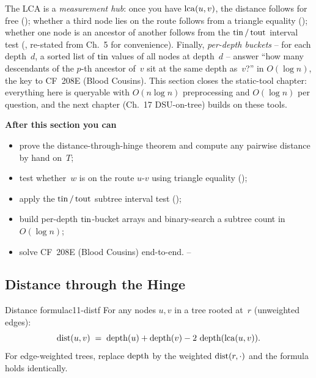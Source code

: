 \begin{topicintro}
The LCA is a \emph{measurement hub}: once you have \(\operatorname{lca}(u,v)\), the
distance follows for free (); whether a third node
lies on the route follows from a triangle equality
(); whether one node is an ancestor of another
follows from the \(\operatorname{tin}/\operatorname{tout}\) interval test (,
re-stated from Ch.~5 for convenience).  Finally, \emph{per-depth
buckets} -- for each depth~\(d\), a sorted list of \(\operatorname{tin}\) values of all
nodes at depth~\(d\) -- answer ``how many descendants of the \(p\)-th
ancestor of~\(v\) sit at the same depth as~\(v\)?'' in \(O(\log n)\),
the key to CF~208E (Blood Cousins).  This section closes the static-tool
chapter: everything here is queryable with \(O(n\log n)\) preprocessing
and \(O(\log n)\) per question, and the next chapter (Ch.~17 DSU-on-tree)
builds on these tools.

\textbf{After this section you can}
\begin{itemize}[nosep]
  \item prove the distance-through-hinge theorem and compute any
        pairwise distance by hand on~\(T\); \hfill{}
  \item test whether~\(w\) is on the route \(u\)-\(v\) using triangle
        equality (); \hfill{}
  \item apply the \(\operatorname{tin}/\operatorname{tout}\) subtree interval test
        (); \hfill{}
  \item build per-depth \(\operatorname{tin}\)-bucket arrays and binary-search a
        subtree count in \(O(\log n)\); \hfill{}
  \item solve CF~208E (Blood Cousins) end-to-end. \hfill{}--
\end{itemize}
\end{topicintro}

\subsection{Distance through the Hinge}

\begin{theorem}{Distance formula}{c11-distf}
For any nodes \(u, v\) in a tree rooted at~\(r\) (unweighted edges):
\[
  \operatorname{dist}(u,v) \;=\; \operatorname{depth}(u) + \operatorname{depth}(v) - 2\,\operatorname{depth}(\operatorname{lca}(u,v)).
\]
For edge-weighted trees, replace \(\operatorname{depth}\) by the weighted
\(\operatorname{dist}(r,\cdot)\) and the formula holds identically.
\end{theorem}

